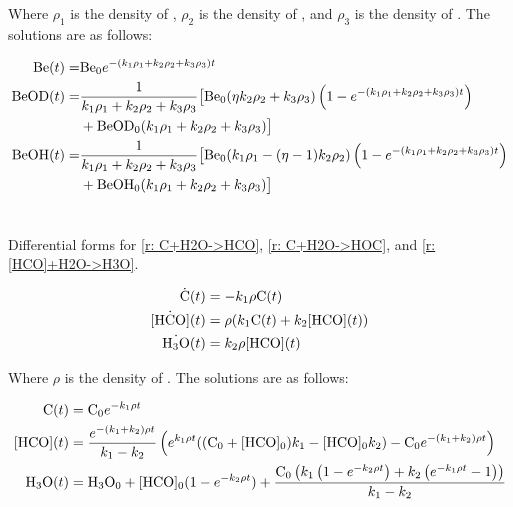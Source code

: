 Where $\rho_1$ is the density of , $\rho_2$ is the density of , and $\rho_3$ is the density of . The solutions are as follows:

\begin{align}
	\ce{Be}(t) = &  \ce{Be0} e^{-(k_1 \rho_1+k_2 \rho_2+k_3 \rho_3)t} \label{eq: HOD Be(t)} \\
	\ce{BeOD}(t) = & \frac{1}{k_1 \rho_1+k_2 \rho_2+k_3 \rho_3} \big[\ce{Be0} (\eta k_2 \rho_2+k_3 \rho_3) \left(1-e^{-(k_1 \rho_1+k_2 \rho_2+k_3 \rho_3)t}\right) \label{eq: HOD BeOD(t)} \\
	& +\ce{BeOD0} (k_1 \rho_1+k_2 \rho_2+k_3 \rho_3)\big] \\
	\ce{BeOH}(t) = & \frac{1}{k_1 \rho_1+k_2 \rho_2+k_3 \rho_3}\big[\ce{Be0} (k_1 \rho_1-(\eta-1) k_2 \rho_2) \left(1 - e^{-(k_1 \rho_1+k_2 \rho_2+k_3 \rho_3)t}\right) \\
	& + \ce{BeOH0} (k_1 \rho_1+k_2 \rho_2+k_3 \rho_3)\big] \label{eq: HOD BeOH(t)}
\end{align}

\section{} \label{sec: C+H2O eqs}

Differential forms for \ref{r: C+H2O->HCO}, \ref{r: C+H2O->HOC}, and \ref{r: [HCO]+H2O->H3O}.

\begin{align}
	\dot{\ce{C}}(t) & = -k_1 \rho \ce{C}(t) \\
	\dot{\ce{[HCO]}}(t) & = \rho(k_1 \ce{C}(t) + k_2 \ce{[HCO]}(t)) \\
	\dot{\ce{H3O}}(t) & = k_2 \rho \ce{[HCO]}(t)
\end{align}

Where $\rho$ is the density of . The solutions are as follows:

\begin{align}
	\ce{C}(t) & = \ce{C0} e^{-k_1 \rho t} \\
	\ce{[HCO]}(t) & = \frac{e^{-(k_1 + k_2) \rho t}}{k_1 - k_2} \left(e^{k_1 \rho t}((\ce{C0} + \ce{[HCO]0})k_1 - \ce{[HCO]0} k_2) - \ce{C0} e^{-(k_1 + k_2) \rho t}\right) \\
	\ce{H3O}(t) & = \ce{H3O0} + \ce{[HCO]0} (1 - e^{-k_2 \rho t}) + \frac{\ce{C0}\left( k_1 \left(1 - e^{-k_2 \rho t}\right) + k_2 \left(e^{-k_1 \rho t} - 1\right) \right)}{k_1 - k_2}
\end{align}